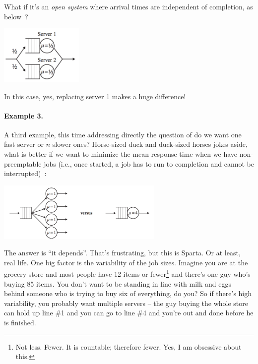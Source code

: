 \documentclass[a4paper]{report}
\begin{document}
What if it's an \textit{open system} where arrival times are independent of completion, as below~\cite{pmd}?


\begin{center}
	\includegraphics[width=0.3\textwidth]{images/qt-example2-2.png}
\end{center}

In this case, yes, replacing server 1 makes a huge difference!

\paragraph{Example 3.} A third example, this time addressing directly the question of do we want one fast server or $n$ slower ones? Horse-sized duck and duck-sized horses jokes aside, what is better if we want to minimize the mean response time when we have non-preemptable jobs (i.e., once started, a job has to run to completion and cannot be interrupted)~\cite{pmd}:


\begin{center}
	\includegraphics[width=0.6\textwidth]{images/qt-example3.png}
\end{center}

The answer is ``it depends''. That's frustrating, but this is Sparta. Or at least, real life. One big factor is the variability of the job sizes. Imagine you are at the grocery store and most people have 12 items or fewer\footnote{Not less. Fewer. It is countable; therefore fewer. Yes, I am obsessive about this.} and there's one guy who's buying 85 items. You don't want to be standing in line with milk and eggs behind someone who is trying to buy six of everything, do you? So if there's high variability, you probably want multiple servers -- the guy buying the whole store can hold up line \#1 and you can go to line \#4 and you're out and done before he is finished.
\end{document}
